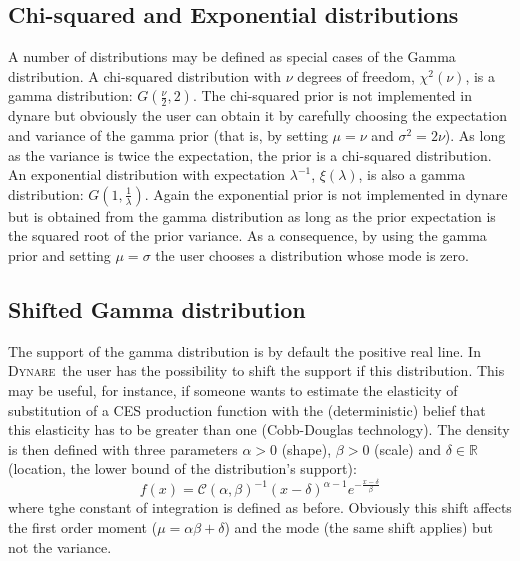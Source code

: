 \documentclass{amsart}
\theoremstyle{plain}
\theoremstyle{remark}
\numberwithin{equation}{section}
\newcommand{\Dynare}{\textsc{Dynare}}
\begin{document}
 \subsection{Chi-squared and Exponential distributions}
 A number of distributions may be defined as special cases of the
 Gamma distribution. A chi-squared distribution with $\nu$ degrees of
 freedom, $\chi^2(\nu)$, is a gamma distribution:
 $G\left(\frac{\nu}{2},2\right)$. The chi-squared prior is not
 implemented in dynare but obviously the user can obtain it by
 carefully choosing the expectation and variance of the gamma prior
 (that is, by setting $\mu=\nu$ and $\sigma^2 = 2\nu$). As long as the
 variance is twice the expectation, the prior is a chi-squared
 distribution. An exponential distribution with expectation
 $\lambda^{-1}$, $\xi(\lambda)$, is also a gamma distribution:
 $G\left(1,\frac{1}{\lambda}\right)$. Again the exponential prior is
 not implemented in dynare but is obtained from the gamma distribution
 as long as the prior expectation is the squared root of the prior
 variance. As a consequence, by using the gamma prior and setting
 $\mu=\sigma$ the user chooses a distribution whose mode is zero.

 \subsection{Shifted Gamma distribution}
 The support of the gamma distribution is by default the positive real
 line. In \Dynare\ the user has the possibility to shift the support
 if this distribution. This may be useful, for instance, if someone
 wants to estimate the elasticity of substitution of a CES production
 function with the (deterministic) belief that this elasticity has to
 be greater than one (Cobb-Douglas technology). The density is then
 defined with three parameters $\alpha>0$ (shape), $\beta>0$ (scale)
 and $\delta\in\mathbb R$ (location, the lower bound of the
 distribution’s support):
 \[
   f(x) = \mathcal C(\alpha, \beta)^{-1}(x-\delta)^{\alpha-1}e^{-\frac{x-\delta}{\beta}}
 \]
 where tghe constant of integration is defined as before. Obviously
 this shift affects the first order moment ($\mu=\alpha\beta+\delta$)
 and the mode (the same shift applies) but not the variance.\newline
\end{document}
